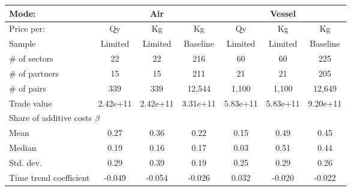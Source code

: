 \begin{tabular}{l|ccc|ccc}
\cline{1-7}
Mode: &
  \multicolumn{3}{|c}{Air} &
  \multicolumn{3}{|c}{Vessel} \\ \hline
Price per: & Qy & Kg & Kg & Qy &  Kg & Kg\\ \cline{1-7}
Sample & Limited &Limited  & Baseline & Limited  & Limited & Baseline \\
\hspace{1em}$\#$ of sectors &
22 &22 &216 &60 &60 &225 \\
\hspace{1em}$\#$ of partners &
15 &15 &211 &21 &21 &205 \\
\hspace{1em}$\#$ of pairs &
339 &339 &12,544 &1,100 &1,100 &12,649 \\
\hspace{1em}Trade value &
2.42e+11 &
2.42e+11 &
3.31e+11 &
5.83e+11 &
5.83e+11 &
9.20e+11 \\ \hline
\multicolumn{7}{l}{Share of additive costs $\beta$} \\ \hline
\hspace{1em} Mean &
0.27 &0.36 &0.22 &0.15 &0.49 &0.45 \\
\hspace{1em} Median &
0.19 &0.16 &0.17 &0.03 &0.51 & 0.44 \\
\hspace{1em} Std. dev. &
0.29 &0.39 &0.19 &0.25 &0.29 &0.26 \\ 
\hspace{1em} Time trend  coefficient & 
-0.049 &-0.054 &-0.026 &0.032 &-0.020 &-0.022 \\ \cline{1-7}
\end{tabular}

